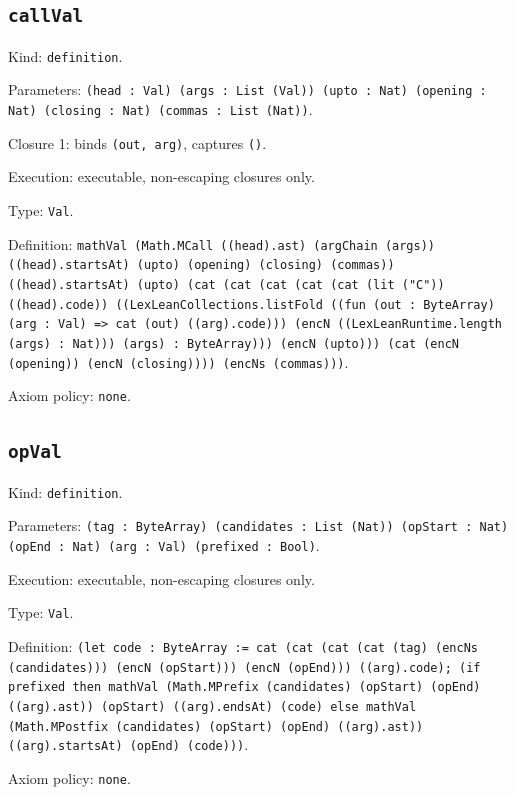 \documentclass[11pt]{article}
\begin{document}
\subsection*{\texttt{callVal}}
\noindent Kind: \texttt{definition}.\par
\noindent Parameters: \texttt{(head : Val) (args : List (Val)) (upto : Nat) (opening : Nat) (closing : Nat) (commas : List (Nat))}.\par
\noindent Closure 1: binds \texttt{(out, arg)}, captures \texttt{()}.\par
\noindent Execution: executable, non-escaping closures only.\par
\noindent Type: \texttt{Val}.\par
\noindent Definition: \texttt{mathVal (Math.MCall ((head).ast) (argChain (args)) ((head).startsAt) (upto) (opening) (closing) (commas)) ((head).startsAt) (upto) (cat (cat (cat (cat (cat (lit ("C")) ((head).code)) ((LexLeanCollections.listFold ((fun (out : ByteArray) (arg : Val) => cat (out) ((arg).code))) (encN ((LexLeanRuntime.length (args) : Nat))) (args) : ByteArray))) (encN (upto))) (cat (encN (opening)) (encN (closing)))) (encNs (commas)))}.\par
\noindent Axiom policy: \texttt{none}.\par
\subsection*{\texttt{opVal}}
\noindent Kind: \texttt{definition}.\par
\noindent Parameters: \texttt{(tag : ByteArray) (candidates : List (Nat)) (opStart : Nat) (opEnd : Nat) (arg : Val) (prefixed : Bool)}.\par
\noindent Execution: executable, non-escaping closures only.\par
\noindent Type: \texttt{Val}.\par
\noindent Definition: \texttt{(let code : ByteArray := cat (cat (cat (cat (tag) (encNs (candidates))) (encN (opStart))) (encN (opEnd))) ((arg).code); (if prefixed then mathVal (Math.MPrefix (candidates) (opStart) (opEnd) ((arg).ast)) (opStart) ((arg).endsAt) (code) else mathVal (Math.MPostfix (candidates) (opStart) (opEnd) ((arg).ast)) ((arg).startsAt) (opEnd) (code)))}.\par
\noindent Axiom policy: \texttt{none}.\par
\end{document}
